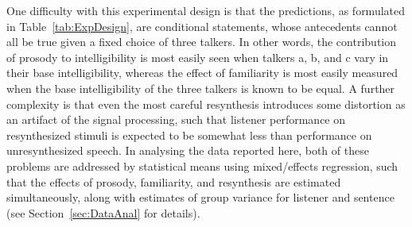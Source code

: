One difficulty with this experimental design is that the predictions, as formulated in Table~\ref{tab:ExpDesign}, are conditional statements, whose antecedents cannot all be true given a fixed choice of three talkers.  In other words, the contribution of prosody to intelligibility is most easily seen when talkers \ac{a}, \ac{b}, and \ac{c} vary in their base intelligibility, whereas the effect of familiarity is most easily measured when the base intelligibility of the three talkers is known to be equal.  A further complexity is that even the most careful resynthesis introduces some distortion as an artifact of the signal processing, such that listener performance on resynthesized stimuli is expected to be somewhat less than performance on unresynthesized speech.  In analysing the data reported here, both of these problems are addressed by statistical means using mixed\-/effects regression, such that the effects of prosody, familiarity, and resynthesis are estimated simultaneously, along with estimates of group variance for listener and sentence (see Section~\ref{sec:DataAnal} for details).



